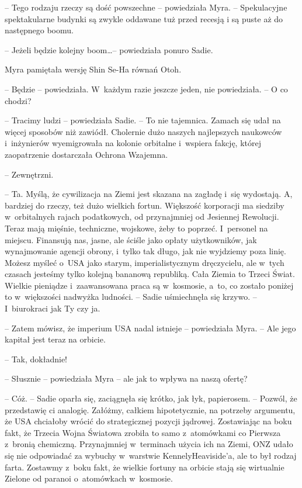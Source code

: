\documentclass[oneside,polish,11pt,sfheadings]{mwbk}
\begin{document}
-- Tego rodzaju rzeczy są dość powszechne -- powiedziała Myra. -- Spekulacyjne spektakularne budynki są zwykle oddawane tuż przed recesją
i są puste aż do następnego boomu.

-- Jeżeli będzie kolejny boom\ldots -- powiedziała ponuro Sadie.

Myra pamiętała wersję Shin Se-Ha równań Otoh. 

-- Będzie -- powiedziała. W~każdym razie jeszcze jeden, nie powiedziała. -- O co chodzi?

-- Tracimy ludzi -- powiedziała Sadie. -- To nie tajemnica. Zamach się udał
na więcej sposobów niż zawiódł. Cholernie dużo naszych najlepszych
naukowców i~inżynierów wyemigrowała na kolonie orbitalne i~wspiera
fakcję, której zaopatrzenie dostarczała Ochrona Wzajemna.

-- Zewnętrzni.

-- Ta. Myślą, że cywilizacja na Ziemi jest skazana na zagładę i~się
wydostają. A, bardziej do rzeczy, też dużo wielkich fortun. Większość
korporacji ma siedziby w~orbitalnych rajach podatkowych, od przynajmniej
od Jesiennej Rewolucji. Teraz mają mięśnie, techniczne, wojskowe, żeby
to poprzeć. I~personel na miejscu. Finansują nas, jasne, ale ściśle jako
opłaty użytkowników, jak wynajmowanie agencji obrony, i~tylko tak długo,
jak nie wyjdziemy poza linię. Możesz myśleć o~USA jako starym,
imperialistycznym dręczycielu, ale w~tych czasach jesteśmy tylko kolejną
bananową republiką. Cała Ziemia to Trzeci Świat. Wielkie pieniądze i~zaawansowana praca są w~kosmosie, a~to, co zostało poniżej to w~większości nadwyżka ludności. -- Sadie uśmiechnęła się krzywo. -- I~biurokraci jak Ty czy ja.

-- Zatem mówisz, że imperium USA nadal istnieje -- powiedziała Myra. -- Ale
jego kapitał jest teraz na orbicie.

-- Tak, dokładnie!

-- Słusznie -- powiedziała Myra -- ale jak to wpływa na naszą ofertę?

-- Cóż. -- Sadie oparła się, zaciągnęła się krótko, jak łyk, papierosem. -- Pozwól, że przedstawię ci analogię. Załóżmy, całkiem hipotetycznie, na
potrzeby argumentu, że USA chciałoby wrócić do strategicznej pozycji
jądrowej. Zostawiając na boku fakt, że Trzecia Wojna Światowa zrobiła to
samo z~atomówkami co Pierwsza z~bronią chemiczną. Przynajmniej w~terminach użycia ich na Ziemi, ONZ udało się nie odpowiadać za wybuchy w~warstwie Kennely\dywiz Heaviside'a, ale to był rodzaj farta. Zostawmy z~boku
fakt, że wielkie fortuny na orbicie stają się wirtualnie Zielone od
paranoi o~atomówkach w~kosmosie.
\end{document}
